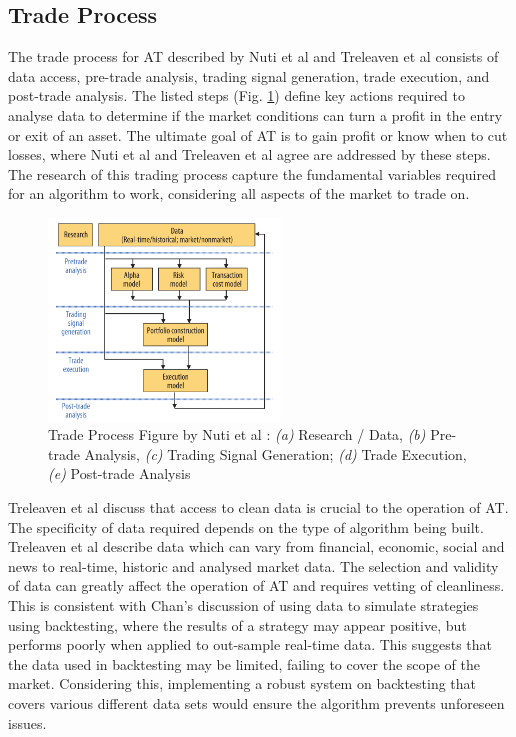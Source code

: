 \subsection{Trade Process}
\label{sec:related:algoTrading:tradeprocess}
The trade process for AT described by Nuti et al \cite{ART:Nuti:2011} and Treleaven et al  \cite{ART:Treleaven:2013} consists of data access, pre-trade analysis, trading signal generation, trade execution, and post-trade analysis. The listed steps (Fig. \ref{fig:related:tradeprocess}) define key actions required to analyse data to determine if the market conditions can turn a profit in the entry or exit of an asset. The ultimate goal of AT is to gain profit or know when to cut losses, where Nuti et al \cite{ART:Nuti:2011} and Treleaven et al  \cite{ART:Treleaven:2013} agree are addressed by these steps. The research of this trading process capture the fundamental variables required for an algorithm to work, considering all aspects of the market to trade on.

\begin{figure}[htb]
    \centering
	\includegraphics[width=0.55\textwidth]{content/graphics/AT-trade_process}
	\caption{Trade Process Figure by Nuti et al \cite{ART:Nuti:2011}: \textit{(a)} Research / Data, \textit{(b)} Pre-trade Analysis, \textit{(c)} Trading Signal Generation; \textit{(d)} Trade Execution, \textit{(e)} Post-trade Analysis }
	\label{fig:related:tradeprocess}
\end{figure}

Treleaven et al \cite{ART:Treleaven:2013} discuss that access to clean data is crucial to the operation of AT. The specificity of data required depends on the type of algorithm being built. Treleaven et al describe data which can vary from financial, economic, social and news to real-time, historic and analysed market data. The selection and validity of data can greatly affect the operation of AT and requires vetting of cleanliness. This is consistent with Chan's \cite{BOOK:Chan:2013}  discussion of using data to simulate strategies using backtesting, where the results of a strategy may appear positive, but performs poorly when applied to out-sample real-time data. This suggests that the data used in backtesting may be limited, failing to cover the scope of the market. Considering this, implementing a robust system on backtesting that covers various different data sets would ensure the algorithm prevents unforeseen issues.

